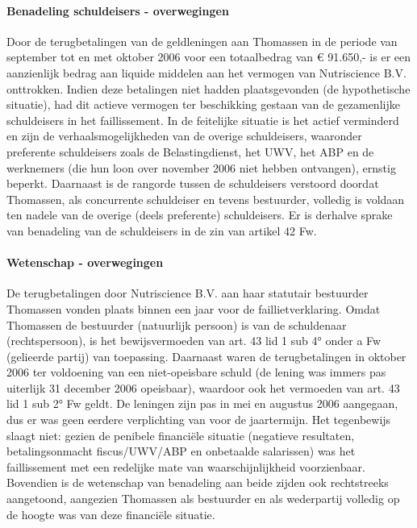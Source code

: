 \documentclass[
  dutch,
  a4paper,
]{article}
\begin{document}
\paragraph{Benadeling schuldeisers - overwegingen}\label{benadeling-schuldeisers---overwegingen-74}

Door de terugbetalingen van de geldleningen aan Thomassen in de periode van september tot en met oktober 2006 voor een totaalbedrag van € 91.650,- is er een aanzienlijk bedrag aan liquide middelen aan het vermogen van Nutriscience B.V. onttrokken. Indien deze betalingen niet hadden plaatsgevonden (de hypothetische situatie), had dit actieve vermogen ter beschikking gestaan van de gezamenlijke schuldeisers in het faillissement. In de feitelijke situatie is het actief verminderd en zijn de verhaalsmogelijkheden van de overige schuldeisers, waaronder preferente schuldeisers zoals de Belastingdienst, het UWV, het ABP en de werknemers (die hun loon over november 2006 niet hebben ontvangen), ernstig beperkt. Daarnaast is de rangorde tussen de schuldeisers verstoord doordat Thomassen, als concurrente schuldeiser en tevens bestuurder, volledig is voldaan ten nadele van de overige (deels preferente) schuldeisers. Er is derhalve sprake van benadeling van de schuldeisers in de zin van artikel 42 Fw.

\paragraph{Wetenschap - overwegingen}\label{wetenschap---overwegingen-74}

De terugbetalingen door Nutriscience B.V. aan haar statutair bestuurder Thomassen vonden plaats binnen een jaar voor de faillietverklaring. Omdat Thomassen de bestuurder (natuurlijk persoon) is van de schuldenaar (rechtspersoon), is het bewijsvermoeden van art. 43 lid 1 sub 4° onder a Fw (gelieerde partij) van toepassing. Daarnaast waren de terugbetalingen in oktober 2006 ter voldoening van een niet-opeisbare schuld (de lening was immers pas uiterlijk 31 december 2006 opeisbaar), waardoor ook het vermoeden van art. 43 lid 1 sub 2° Fw geldt. De leningen zijn pas in mei en augustus 2006 aangegaan, dus er was geen eerdere verplichting van voor de jaartermijn. Het tegenbewijs slaagt niet: gezien de penibele financiële situatie (negatieve resultaten, betalingsonmacht fiscus/UWV/ABP en onbetaalde salarissen) was het faillissement met een redelijke mate van waarschijnlijkheid voorzienbaar. Bovendien is de wetenschap van benadeling aan beide zijden ook rechtstreeks aangetoond, aangezien Thomassen als bestuurder en als wederpartij volledig op de hoogte was van deze financiële situatie.
\end{document}
